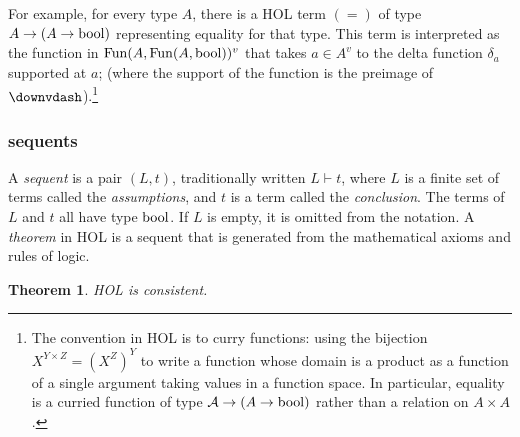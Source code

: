 \documentclass[brochure,english,12pt]{bourbaki}
\theoremstyle{plain}
\newtheorem{theorem}[equation]{Theorem}
\def\A{{\mathcal A}}
\begin{document}
For example,
for every type $A$,
there is a HOL term $(=)$ of type $A\to (A\to {\operatorname{bool}})$ representing equality for that type. 
This term is interpreted
as the function in ${\operatorname{Fun}}(A,{\operatorname{Fun}}(A,{\operatorname{bool}}))^{v}$ that
takes $a\in A^{v}$ to the delta function $\delta_a$ supported at $a$; 
(where the support of the function is the preimage of $\downvdash$).\footnote{The convention in HOL is to curry functions: using the bijection
$X^{Y \times Z} = (X^Z)^Y$ to write a function whose domain is a product as a function
of a single argument taking values in a function space. In particular, 
equality is a curried function of type $\A\to (A \to\bool)$
rather than a relation on $A\times A$.}


\subsubsection{sequents}

A {\it sequent} is a pair $(L,t)$, traditionally written $L\vdash t$, where $L$ is a finite set of terms
called the {\it assumptions}, and $t$ is a term called the {\it conclusion}.  The
terms of $L$ and $t$ all have type ${\operatorname{bool}}$.   If $L$ is empty, it is omitted from the
notation.  A {\it theorem} in HOL is a sequent that is generated from the mathematical axioms
and rules of logic.  

\begin{theorem} HOL is consistent.
\end{theorem}
\end{document}
